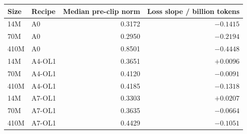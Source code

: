 \begin{tabular}{@{}llrr@{}}
\toprule
Size & Recipe & Median pre-clip norm & Loss slope / billion tokens \\
\midrule
14M & A0 & 0.3172 & $-0.1415$ \\
70M & A0 & 0.2950 & $-0.2194$ \\
410M & A0 & 0.8501 & $-0.4448$ \\
14M & A4-OL1 & 0.3651 & $+0.0096$ \\
70M & A4-OL1 & 0.4120 & $-0.0091$ \\
410M & A4-OL1 & 0.4185 & $-0.1318$ \\
14M & A7-OL1 & 0.3303 & $+0.0207$ \\
70M & A7-OL1 & 0.3635 & $-0.0664$ \\
410M & A7-OL1 & 0.4429 & $-0.1051$ \\
\bottomrule
\end{tabular}
